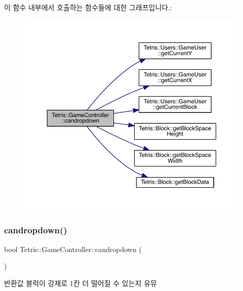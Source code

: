 이 함수 내부에서 호출하는 함수들에 대한 그래프입니다.\+:
\nopagebreak
\begin{figure}[H]
\begin{center}
\leavevmode
\includegraphics[width=350pt]{class_tetris_1_1_game_controller_ac4993d5ad8640ac617fec341fdb301ee_cgraph}
\end{center}
\end{figure}
\mbox{\label{class_tetris_1_1_game_controller_ac4993d5ad8640ac617fec341fdb301ee}} 
\subsubsection{\texorpdfstring{candropdown()}{candropdown()}\hspace{0.1cm}{\footnotesize\ttfamily [2/2]}}
{\footnotesize\ttfamily bool Tetris\+::\+Game\+Controller\+::candropdown (\begin{DoxyParamCaption}{ }\end{DoxyParamCaption})\hspace{0.3cm}{\ttfamily [inline]}}

\begin{DoxyReturn}{반환값}
블럭이 강제로 1칸 더 떨어질 수 있는지 유뮤 
\end{DoxyReturn}


